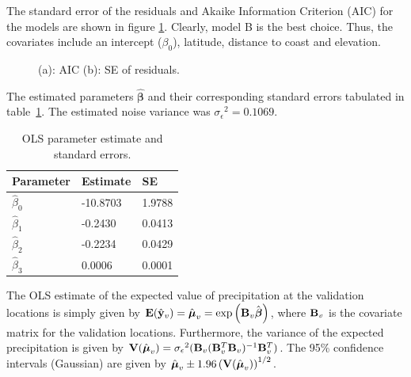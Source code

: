\documentclass[a4paper,10pt]{article}
\def\bB{{\bf B}}
\def\bE{{\bf E}}
\def\bV{{\bf V}}
\def\by{{\bf y}}
\def\bbeta{{\boldsymbol \beta}}
\def\bmu{{\boldsymbol \mu}}
\def\sigmaeps{{\sigma_{\epsilon}}}
\begin{document}
The standard error of the residuals and Akaike Information Criterion (AIC) for the models are shown in figure \ref{fig:aicse}. Clearly, model B is the best choice. Thus, the covariates include an intercept ($\beta_0$), latitude, distance to coast and elevation.
\begin{figure}[ht]
\centering
  \qquad
  \caption{(a): AIC (b): SE of residuals.}
\label{fig:aicse}
\end{figure}

The estimated parameters $\hat \bbeta$ and their corresponding standard errors tabulated in table~\ref{tab:olsparest}. The estimated noise variance was $\sigmaeps^2 = 0.1069$.
\begin{table}[H]
\centering
\begin{tabular}{lll}
\hline
{\bf Parameter} & {\bf Estimate} & {\bf SE} \\
\hline
$\hat \beta_0$ & -10.8703 & 1.9788 \\
$\hat \beta_1$ & -0.2430 & 0.0413 \\
$\hat \beta_2$ & -0.2234 & 0.0429 \\
$\hat \beta_3$ & 0.0006 & 0.0001 \\
\hline
\end{tabular}
\caption{OLS parameter estimate and standard errors.}
\label{tab:olsparest}
\end{table}

The OLS estimate of the expected value of precipitation at the validation locations is simply given by $\bE(\hat \by_v) = \hat \bmu_v = \exp \left( \bB_v \hat \bbeta \right)$, where $\bB_v$ is the covariate matrix for the validation locations. Furthermore, the variance of the expected precipitation is given by $\bV(\hat \bmu_v) = \sigmaeps^2 (\bB_v (\bB_v^T\bB_v)^{-1} \bB_v^T)$. The 95\% confidence intervals (Gaussian) are given by $\hat \bmu_v \pm 1.96 \left( \bV(\hat \bmu_v) \right)^{1/2}$.
\end{document}
